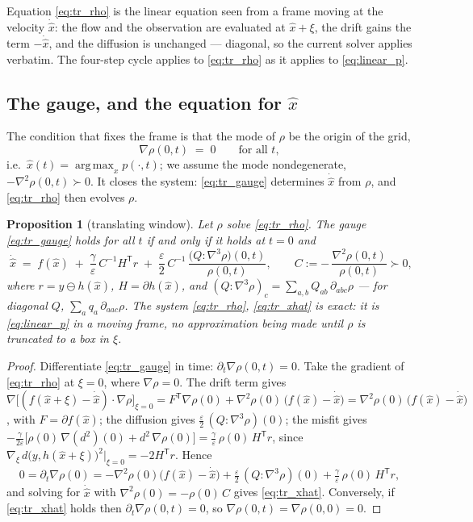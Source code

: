 \documentclass[11pt,a4paper]{article}
\newcommand{\argmax}{\operatorname{arg\,max}}
\newcommand{\T}{^{\mathsf T}}
\newcommand{\xh}{\hat{x}}
\newcommand{\eps}{\varepsilon}
\newcommand{\grad}{\nabla}
\theoremstyle{plain}
\newtheorem{proposition}{Proposition}
\theoremstyle{definition}
\theoremstyle{remark}
\begin{document}
Equation \eqref{eq:tr_rho} is the linear equation seen from a frame moving at the velocity $\dot{\xh}$: the flow and the observation are evaluated at $\xh+\xi$, the drift gains the term $-\dot{\xh}$, and the diffusion is unchanged --- diagonal, so the current solver applies verbatim. The four-step cycle applies to \eqref{eq:tr_rho} as it applies to \eqref{eq:linear_p}.

\subsection{The gauge, and the equation for \texorpdfstring{$\xh$}{xhat}}

The condition that fixes the frame is that the mode of $\rho$ be the origin of the grid,
\begin{equation}
  \grad\rho(0,t) \;=\; 0 \qquad\text{for all } t,
  \label{eq:tr_gauge}
\end{equation}
i.e.\ $\xh(t) = \argmax_xp(\cdot,t)$; we assume the mode nondegenerate, $-\grad^2\rho(0,t)\succ0$. It closes the system: \eqref{eq:tr_gauge} determines $\dot{\xh}$ from $\rho$, and \eqref{eq:tr_rho} then evolves $\rho$.

\begin{proposition}[translating window]
\label{prop:tr}
Let $\rho$ solve \eqref{eq:tr_rho}. The gauge \eqref{eq:tr_gauge} holds for all $t$ if and only if it holds at $t=0$ and
\begin{equation}
  \boxed{\;
  \dot{\xh} \;=\; f(\xh) \;+\; \frac{\gamma}{\eps}\,C^{-1}H\T r \;+\; \frac\eps2\,C^{-1}\,\frac{\big(Q\!:\!\grad^3\rho\big)(0,t)}{\rho(0,t)},
  \qquad C := -\,\frac{\grad^2\rho(0,t)}{\rho(0,t)} \succ 0,\;}
  \label{eq:tr_xhat}
\end{equation}
where $r = y\ominus h(\xh)$, $H=\partial h(\xh)$, and $(Q\!:\!\grad^3\rho)_c = \sum_{a,b}Q_{ab}\,\partial_{abc}\rho$ --- for diagonal $Q$, $\sum_aq_a\,\partial_{aac}\rho$. The system \eqref{eq:tr_rho}, \eqref{eq:tr_xhat} is exact: it is \eqref{eq:linear_p} in a moving frame, no approximation being made until $\rho$ is truncated to a box in $\xi$.
\end{proposition}
\begin{proof}
Differentiate \eqref{eq:tr_gauge} in time: $\partial_t\grad\rho(0,t)=0$. Take the gradient of \eqref{eq:tr_rho} at $\xi=0$, where $\grad\rho=0$. The drift term gives $\grad\big[(f(\xh+\xi)-\dot{\xh})\cdot\grad\rho\big]_{\xi=0} = F\T\grad\rho(0) + \grad^2\rho(0)\,\big(f(\xh)-\dot{\xh}\big) = \grad^2\rho(0)\,\big(f(\xh)-\dot{\xh}\big)$, with $F=\partial f(\xh)$; the diffusion gives $\tfrac\eps2\,(Q\!:\!\grad^3\rho)(0)$; the misfit gives $-\tfrac{\gamma}{2\eps}\big[\rho(0)\,\grad(d^2)(0) + d^2\,\grad\rho(0)\big] = \tfrac\gamma\eps\,\rho(0)\,H\T r$, since $\grad_\xi\,d\big(y,h(\xh+\xi)\big)^2\big|_{\xi=0} = -2H\T r$. Hence
\[
  0 = \partial_t\grad\rho(0) = -\grad^2\rho(0)\big(f(\xh)-\dot{\xh}\big) + \tfrac\eps2\,(Q\!:\!\grad^3\rho)(0) + \tfrac\gamma\eps\,\rho(0)\,H\T r ,
\]
and solving for $\dot{\xh}$ with $\grad^2\rho(0) = -\rho(0)\,C$ gives \eqref{eq:tr_xhat}. Conversely, if \eqref{eq:tr_xhat} holds then $\partial_t\grad\rho(0,t)=0$, so $\grad\rho(0,t)=\grad\rho(0,0)=0$.
\end{proof}
\end{document}
